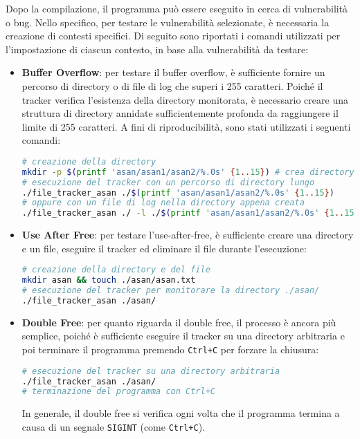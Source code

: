 Dopo la compilazione, il programma può essere eseguito in cerca di vulnerabilità
o bug. Nello specifico, per testare le vulnerabilità selezionate, è necessaria
la creazione di contesti specifici. Di seguito sono riportati i comandi utilizzati
per l'impostazione di ciascun contesto, in base alla vulnerabilità da testare:
\begin{itemize}
  \item \textbf{Buffer Overflow}: per testare il buffer overflow, è sufficiente
    fornire un percorso di directory o di file di log che superi i 255 caratteri.
    Poiché il tracker verifica l'esistenza della directory monitorata, è
    necessario creare una struttura di directory annidate sufficientemente
    profonda da raggiungere il limite di 255 caratteri. A fini di riproducibilità,
    sono stati utilizzati i seguenti comandi: \begin{lstlisting}[language=bash, numbers=none]
# creazione della directory
mkdir -p $(printf 'asan/asan1/asan2/%.0s' {1..15}) # crea directory annidate
# esecuzione del tracker con un percorso di directory lungo
./file_tracker_asan ./$(printf 'asan/asan1/asan2/%.0s' {1..15})
# oppure con un file di log nella directory appena creata
./file_tracker_asan ./ -l ./$(printf 'asan/asan1/asan2/%.0s' {1..15})logfile.log
    \end{lstlisting}

  \item \textbf{Use After Free}: per testare l'use-after-free, è sufficiente
    creare una directory e un file, eseguire il tracker ed eliminare il file durante
    l'esecuzione:
    \begin{lstlisting}[language=bash, numbers=none]
# creazione della directory e del file
mkdir asan && touch ./asan/asan.txt
# esecuzione del tracker per monitorare la directory ./asan/
./file_tracker_asan ./asan/
    \end{lstlisting}

  \item \textbf{Double Free}: per quanto riguarda il double free, il processo è
    ancora più semplice, poiché è sufficiente eseguire il tracker su una directory
    arbitraria e poi terminare il programma premendo \texttt{Ctrl+C} per forzare
    la chiusura: \begin{lstlisting}[language=bash, numbers=none]
# esecuzione del tracker su una directory arbitraria
./file_tracker_asan ./asan/
# terminazione del programma con Ctrl+C
    \end{lstlisting}
    In generale, il double free si verifica ogni volta che il programma termina
    a causa di un segnale \texttt{SIGINT} (come \texttt{Ctrl+C}).
\end{itemize}

